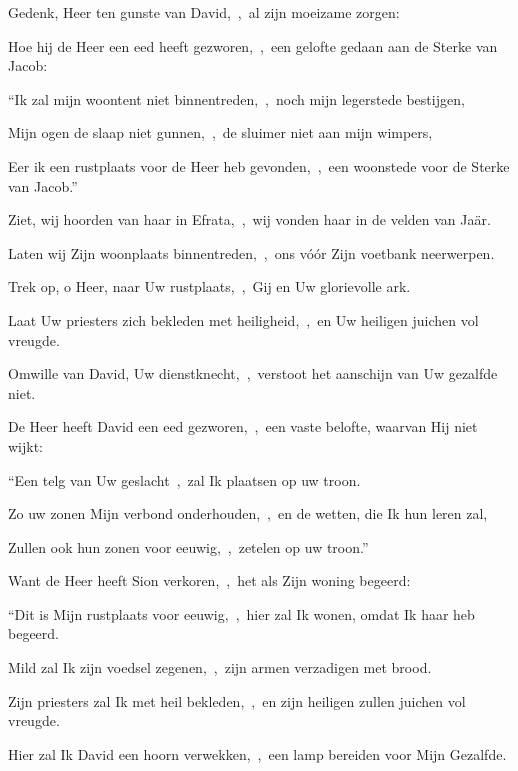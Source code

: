 \documentclass[12pt,twoside,a5paper]{article}
\begin{document}
\begin{halfparskip}

   Gedenk, Heer ten gunste van David,~\sep\ al zijn moeizame zorgen:

  Hoe hij de Heer een eed heeft gezworen,~\sep\ een gelofte gedaan aan de Sterke van Jacob:


  ``Ik zal mijn woontent niet binnentreden,~\sep\ noch mijn legerstede bestijgen,

  Mijn ogen de slaap niet gunnen,~\sep\ de sluimer niet aan mijn wimpers,

  Eer ik een rustplaats voor de Heer heb gevonden,~\sep\ een woonstede voor de Sterke van Jacob.''

  Ziet, wij hoorden van haar in Efrata,~\sep\ wij vonden haar in de velden van Jaär.

  Laten wij Zijn woonplaats binnentreden,~\sep\ ons vóór Zijn voetbank neerwerpen.

  Trek op, o Heer, naar Uw rustplaats,~\sep\ Gij en Uw glorievolle ark.

  Laat Uw priesters zich bekleden met heiligheid,~\sep\ en Uw heiligen juichen vol vreugde.

  Omwille van David, Uw dienstknecht,~\sep\ verstoot het aanschijn van Uw gezalfde niet.

  De Heer heeft David een eed gezworen,~\sep\ een vaste belofte, waarvan Hij niet wijkt:

  ``Een telg van Uw geslacht~\sep\ zal Ik plaatsen op uw troon.

  Zo uw zonen Mijn verbond onderhouden,~\sep\ en de wetten, die Ik hun leren zal,

  Zullen ook hun zonen voor eeuwig,~\sep\ zetelen op uw troon.''

  Want de Heer heeft Sion verkoren,~\sep\ het als Zijn woning begeerd:

  ``Dit is Mijn rustplaats voor eeuwig,~\sep\ hier zal Ik wonen, omdat Ik haar heb begeerd.

  Mild zal Ik zijn voedsel zegenen,~\sep\ zijn armen verzadigen met brood.

  Zijn priesters zal Ik met heil bekleden,~\sep\ en zijn heiligen zullen juichen vol vreugde.

  Hier zal Ik David een hoorn verwekken,~\sep\ een lamp bereiden voor Mijn Gezalfde.


\end{halfparskip}
\end{document}
